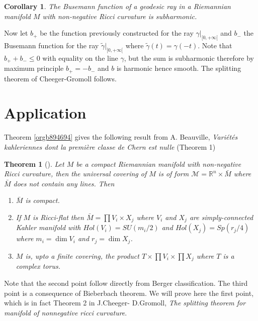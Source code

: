 \documentclass[11pt]{article}
\newtheorem{theorem}{Theorem}
\newtheorem{corollary}{Corollary}[theorem]
\begin{document}
\begin{corollary}
The Busemann function of a geodesic ray in a Riemannian manifold \(M\) with non-negative Ricci
curvature is subharmonic.
\end{corollary}


Now let \(b_+\) be the function previously constructed for the ray \(\gamma|_{[0,+\infty[}\) and \(b_-\)
the Busemann function for the ray \(\tilde\gamma|_{[0,+\infty[}\) where \(\tilde\gamma(t) =
\gamma(-t)\). Note that \(b_+ + b_-\leq 0\) with equality on the line \(\gamma\), but the sum is
subharmonic therefore by maximum principle \(b_+ = -b_-\) and \(b\) is harmonic hence smooth. The
splitting theorem of Cheeger-Gromoll follows.


\section{Application}
\label{sec:org79eaa71}
Theorem \ref{orgb894694} gives the following result from A. Beauville, \emph{Variétés kahleriennes dont la première classe
de Chern est nulle} (Theorem 1)
\begin{theorem}[]
\label{thm:decomp-Ricci-non-negative}
\label{org42111b9}
Let \(M\) be a compact Riemannian manifold with non-negative Ricci curvature, then the universal
covering of \(M\) is of form \(\mathcal{M} = \mathbb{R}^n\times \bar M\) where \(\bar M\) does not contain
any lines. Then
\begin{enumerate}
\item \(\bar M\) is compact.
\item If \(M\) is Ricci-flat then \(\bar M = \prod V_i\times X_j\) where \(V_i\) and \(X_j\) are
simply-connected Kahler manifold with \(Hol(V_i) = SU(m_i/2)\) and \(Hol(X_j) = Sp(r_j/4)\) where
\(m_i=\dim V_i\) and \(r_j = \dim X_j\).
\item \(M\) is, upto a finite covering, the product \(T\times \prod V_i \times \prod X_j\) where \(T\) is a
complex torus.
\end{enumerate}
\end{theorem}

Note that the second point follow directly from Berger classification. The third point is a
consequence of Bieberbach theorem. We will prove here the first point, which is in fact Theorem 2 in
J.Cheeger- D.Gromoll, \emph{The splitting theorem for manifold of nonnegative ricci curvature}.
\end{document}
